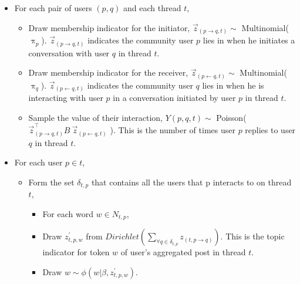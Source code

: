 \documentclass{sig-alternate}
\begin{document}
\begin{itemize}[noitemsep,nolistsep]
  \item For each pair of users $(p, q)$ and each thread $t$,
  \begin{itemize}[noitemsep,nolistsep]
    \item Draw membership indicator for the initiator, 
    $\overset{\rightarrow}{z}_{(p \rightarrow q,t)} \sim$
    Multinomial($\uppi_{p}$). 
	$\overset{\rightarrow}{z}_{(p \rightarrow q,t)}$ indicates
	the community user $p$ lies in when he initiates a conversation
	with user $q$ in thread $t$.
    \item Draw membership indicator for the receiver,
    $\overset{\rightarrow}{z}_{(p \leftarrow q,t)} \sim$
    Multinomial($\uppi_{q}$).
	$\overset{\rightarrow}{z}_{(p \leftarrow q,t)}$ indicates the
	community user $q$ lies in when he is interacting with user $p$
	in a conversation initiated by user $p$ in thread $t$.
    \item Sample the value of their interaction, $Y(p,q,t) \sim$
    Poisson( ${\overset{\rightarrow}{z}}^{\top}_{(p \rightarrow q,t)}
    B~\overset{\rightarrow}{z}_{(p \leftarrow q,t)}$ ). This is 
	the number of times user $p$ replies to user $q$ in thread $t$.
	\end{itemize}
	\item For each user $p \in t$,
	\begin{itemize}[noitemsep,nolistsep]
	  \item Form the set $\delta_{t,p}$ that contains all the users that p
	  interacts to on thread $t$,
	  \begin{itemize}[noitemsep,nolistsep]
	    \item For each word $w \in N_{t,p}$, 
	    \item Draw $z^{'}_{t,p,w}$ from $Dirichlet(\sum_{\forall q\in \delta_{t,p}} z_{(t,p
	    \rightarrow q)})$. This is the topic indicator for token $w$ of user's aggregated
		post in thread $t$.
	    \item Draw $w \sim \phi(w|\beta,z^{'}_{t,p,w}) $.
	  \end{itemize}
  \end{itemize}
\end{itemize}  
\end{document}
